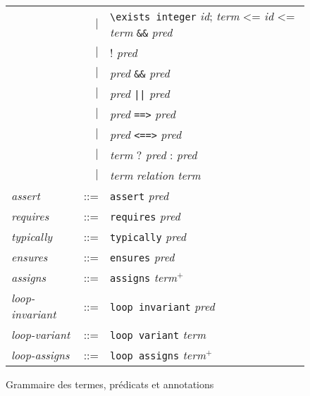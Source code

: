 \begin{figure}[tb]
\begin{tabular}{lrl}
    & $\mid$ & \lstinline'\exists integer' \textit{id};
    \textit{term} <= \textit{id} <= \textit{term}
    \lstinline'&&' \textit{pred} \\
    & $\mid$ & ! \textit{pred} \\
    & $\mid$ & \textit{pred} \lstinline'&&' \textit{pred} \\
    & $\mid$ & \textit{pred} \lstinline'||' \textit{pred} \\
    & $\mid$ & \textit{pred} \lstinline'==>' \textit{pred} \\
    & $\mid$ & \textit{pred} \lstinline'<==>' \textit{pred} \\
    & $\mid$ & \textit{term} ? \textit{pred} : \textit{pred} \\
    & $\mid$ & \textit{term} \textit{relation} \textit{term} \\
    \textit{assert} & ::= & \lstinline'assert' \textit{pred} \\
    \textit{requires} & ::= & \lstinline'requires' \textit{pred} \\
    \textit{typically} & ::= & \lstinline'typically' \textit{pred} \\
    \textit{ensures} & ::= & \lstinline'ensures' \textit{pred} \\
    \textit{assigns} & ::= & \lstinline'assigns' \textit{term}$^{+}$ \\
    \textit{loop-invariant} & ::= & \lstinline'loop invariant' \textit{pred} \\
    \textit{loop-variant} & ::= & \lstinline'loop variant' \textit{term} \\
    \textit{loop-assigns} & ::= & \lstinline'loop assigns' \textit{term}$^{+}$
  \end{tabular}
  \caption{Grammaire des termes, prédicats et annotations \eacsl}
  \label{fig:gram-eacsl}
\end{figure}

